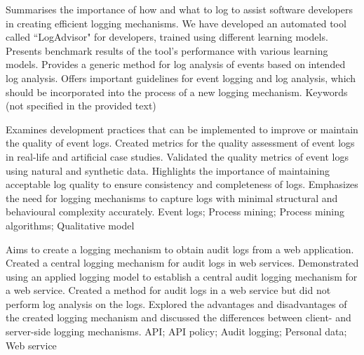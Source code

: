 {
    Summarises the importance of how and what to log to assist software developers in creating efficient logging mechanisms.
}
{
    We have developed an automated tool called “LogAdvisor" for developers, trained using different learning models.
}
{
    Presents benchmark results of the tool's performance with various learning models.
}
{
    Provides a generic method for log analysis of events based on intended log analysis. Offers important guidelines for event logging and log analysis, which should be incorporated into the process of a new logging mechanism.
}
{
    Keywords (not specified in the provided text)
}

{
    Examines development practices that can be implemented to improve or maintain the quality of event logs.
}
{
    Created metrics for the quality assessment of event logs in real-life and artificial case studies.
}
{
    Validated the quality metrics of event logs using natural and synthetic data.
}
{
    Highlights the importance of maintaining acceptable log quality to ensure consistency and completeness of logs. Emphasizes the need for logging mechanisms to capture logs with minimal structural and behavioural complexity accurately.
}
{
    Event logs; Process mining; Process mining algorithms; Qualitative model
}

{
    Aims to create a logging mechanism to obtain audit logs from a web application.
}
{
    Created a central logging mechanism for audit logs in web services.
}
{
    Demonstrated using an applied logging model to establish a central audit logging mechanism for a web service.
}
{
    Created a method for audit logs in a web service but did not perform log analysis on the logs. Explored the advantages and disadvantages of the created logging mechanism and discussed the differences between client- and server-side logging mechanisms.
}
{
    API; API policy; Audit logging; Personal data; Web service
}

